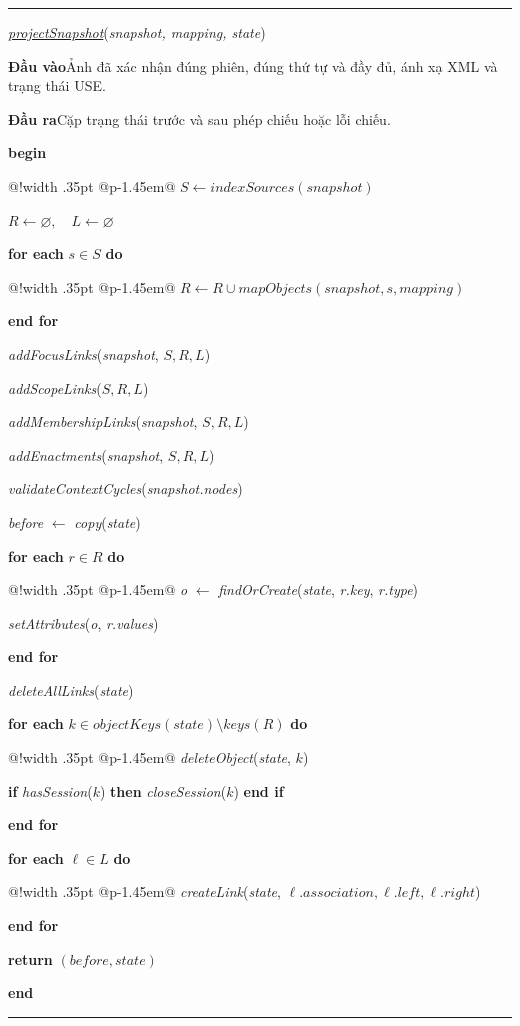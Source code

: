 \documentclass[12pt,a4paper,oneside]{extreport}
\makeatletter
\newenvironment{thesissteps}
  {\par\noindent\begin{tabular}{@{\hspace{.55em}}!{\color{black!50}\vrule width .35pt}%
    @{\hspace{.7em}}p{\dimexpr\linewidth-1.45em\relax}@{}}}
  {\end{tabular}\par}
\makeatother
\begin{document}
\noindent\begin{minipage}{\linewidth}
\setlength{\parindent}{0pt}
\setlength{\parskip}{0pt}
\hrule
\captionsetup{type=thesisalgorithm}
\caption{Chiếu ảnh chụp nguồn sang trạng thái CSL}\label{alg:state-projection}
\textit{\underline{projectSnapshot}}(\textit{snapshot, mapping, state})\par
\textbf{Đầu vào}\quad Ảnh đã xác nhận đúng phiên, đúng thứ tự và đầy đủ, ánh xạ XML và trạng thái USE.\par
\textbf{Đầu ra}\quad Cặp trạng thái trước và sau phép chiếu hoặc lỗi chiếu.\par
\textbf{begin}
\begin{thesissteps}
\(S \gets \mathit{indexSources}(\mathit{snapshot})\)\par
\(R \gets \varnothing,\quad L \gets \varnothing\)\par
\textbf{for each} \(s \in S\) \textbf{do}
\begin{thesissteps}
\(R \gets R \cup \mathit{mapObjects}(\mathit{snapshot},s,\mathit{mapping})\)
\end{thesissteps}
\textbf{end for}\par
\textit{addFocusLinks}(\textit{snapshot}, \(S,R,L\))\par
\textit{addScopeLinks}(\(S,R,L\))\par
\textit{addMembershipLinks}(\textit{snapshot}, \(S,R,L\))\par
\textit{addEnactments}(\textit{snapshot}, \(S,R,L\))\par
\textit{validateContextCycles}(\textit{snapshot.nodes})\par
\textit{before} \(\gets\) \textit{copy}(\textit{state})\par
\textbf{for each} \(r \in R\) \textbf{do}
\begin{thesissteps}
\textit{o} \(\gets\) \textit{findOrCreate}(\textit{state}, \textit{r.key}, \textit{r.type})\par
\textit{setAttributes}(\textit{o}, \textit{r.values})
\end{thesissteps}
\textbf{end for}\par
\textit{deleteAllLinks}(\textit{state})\par
\textbf{for each} \(k \in \mathit{objectKeys}(\mathit{state}) \mathbin{\text{\textbackslash}} \mathit{keys}(R)\) \textbf{do}
\begin{thesissteps}
\textit{deleteObject}(\textit{state}, \(k\))\par
\textbf{if} \textit{hasSession}(\(k\)) \textbf{then} \textit{closeSession}(\(k\)) \textbf{end if}
\end{thesissteps}
\textbf{end for}\par
\textbf{for each} \(\ell \in L\) \textbf{do}
\begin{thesissteps}
\textit{createLink}(\textit{state}, \(\ell.\mathit{association}, \ell.\mathit{left}, \ell.\mathit{right}\))
\end{thesissteps}
\textbf{end for}\par
\textbf{return} \((\mathit{before},\mathit{state})\)
\end{thesissteps}
\textbf{end}\par
\smallskip\hrule
\end{minipage}
\end{document}
